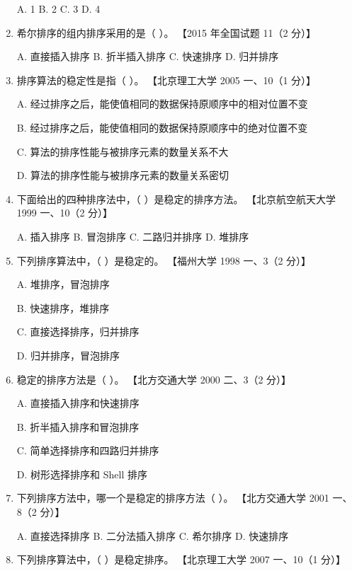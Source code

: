 \documentclass[lang=cn,newtx,10pt,scheme=chinese]{../../elegantbook}
\begin{document}
\begin{enumerate}
    A. 1 \quad B. 2 \quad C. 3 \quad D. 4  

    \item 希尔排序的组内排序采用的是（ ）。  
    【2015 年全国试题 11（2 分）】 

    A. 直接插入排序 \quad B. 折半插入排序 \quad C. 快速排序 \quad D. 归并排序  

    \item 排序算法的稳定性是指（ ）。  
    【北京理工大学 2005 一、10（1 分）】  

    A. 经过排序之后，能使值相同的数据保持原顺序中的相对位置不变  

    B. 经过排序之后，能使值相同的数据保持原顺序中的绝对位置不变  

    C. 算法的排序性能与被排序元素的数量关系不大  

    D. 算法的排序性能与被排序元素的数量关系密切  

    \item 下面给出的四种排序法中，（ ）是稳定的排序方法。  
    【北京航空航天大学 1999 一、10（2 分）】 

    A. 插入排序 \quad B. 冒泡排序 \quad C. 二路归并排序 \quad D. 堆排序  

    \item 下列排序算法中，（ ）是稳定的。  
    【福州大学 1998 一、3（2 分）】  

    A. 堆排序，冒泡排序  

    B. 快速排序，堆排序  

    C. 直接选择排序，归并排序  

    D. 归并排序，冒泡排序  

    \item 稳定的排序方法是（ ）。  
    【北方交通大学 2000 二、3（2 分）】  

    A. 直接插入排序和快速排序  

    B. 折半插入排序和冒泡排序  

    C. 简单选择排序和四路归并排序  

    D. 树形选择排序和 Shell 排序  

    \item 下列排序方法中，哪一个是稳定的排序方法（ ）。  
    【北方交通大学 2001 一、8（2 分）】  

    A. 直接选择排序 \quad B. 二分法插入排序 \quad C. 希尔排序 \quad D. 快速排序  

    \item 下列排序算法中，（ ）是稳定排序。  
    【北京理工大学 2007 一、10（1 分）】  


\end{enumerate}
\end{document}
